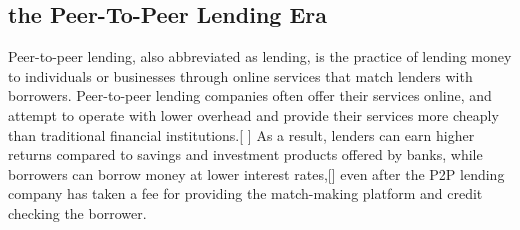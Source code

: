\subsection*{ the Peer-To-Peer Lending Era }
Peer-to-peer lending, also abbreviated as lending, is the practice of lending money to individuals or businesses through online services that match lenders with borrowers. Peer-to-peer lending companies often offer their services online, and attempt to operate with lower overhead and provide their services more cheaply than traditional financial institutions.[ \cite{web002} ] As a result, lenders can earn higher returns compared to savings and investment products offered by banks, while borrowers can borrow money at lower interest rates,[\cite{web002}] even after the P2P lending company has taken a fee for providing the match-making platform and credit checking the borrower.


